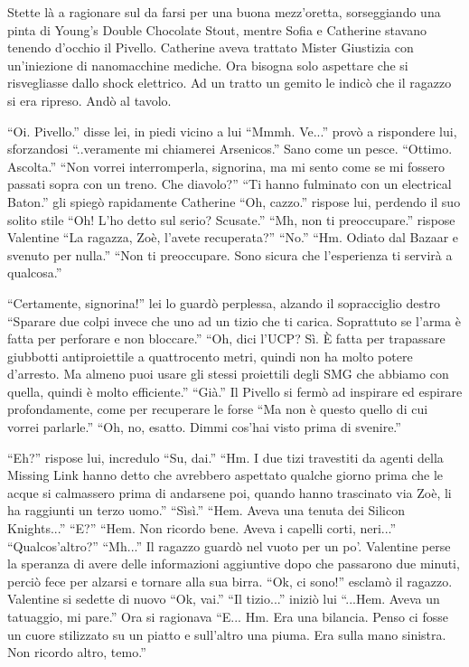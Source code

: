     Stette là a ragionare sul da farsi per una buona mezz'oretta, sorseggiando una pinta di Young's Double Chocolate
    Stout, mentre Sofia e Catherine stavano tenendo d'occhio il Pivello. Catherine aveva trattato Mister Giustizia con
    un'iniezione di nanomacchine mediche. Ora bisogna solo aspettare che si risvegliasse dallo shock elettrico. Ad un
    tratto un gemito le indicò che il ragazzo si era ripreso. Andò al tavolo.

    ``Oi. Pivello.'' disse lei, in piedi vicino a lui ``Mmmh. Ve...'' provò a rispondere lui, sforzandosi ``..veramente
    mi chiamerei Arsenicos.'' Sano come un pesce. ``Ottimo. Ascolta.'' ``Non vorrei interromperla, signorina, ma mi
    sento come se mi fossero passati sopra con un treno. Che diavolo?'' ``Ti hanno fulminato con un electrical Baton.''
    gli spiegò rapidamente Catherine ``Oh, cazzo.'' rispose lui, perdendo il suo solito stile ``Oh! L'ho detto sul
    serio? Scusate.'' ``Mh, non ti preoccupare.'' rispose Valentine ``La ragazza, Zoè, l'avete recuperata?'' ``No.''
    ``Hm. Odiato dal Bazaar e svenuto per nulla.'' ``Non ti preoccupare. Sono sicura che l'esperienza ti servirà a
    qualcosa.'' 

    ``Certamente, signorina!'' lei lo guardò perplessa, alzando il sopracciglio destro ``Sparare due colpi invece che
    uno ad un tizio che ti carica. Soprattuto se l'arma è fatta per perforare e non bloccare.'' ``Oh, dici l'UCP? Sì. È
    fatta per trapassare giubbotti antiproiettile a quattrocento metri, quindi non ha molto potere d'arresto. Ma almeno
    puoi usare gli stessi proiettili degli SMG che abbiamo con quella, quindi è molto efficiente.'' ``Già.'' Il Pivello
    si fermò ad inspirare ed espirare profondamente, come per recuperare le forse ``Ma non è questo quello di cui vorrei
    parlarle.'' ``Oh, no, esatto. Dimmi cos'hai visto prima di svenire.''

    ``Eh?'' rispose lui, incredulo ``Su, dai.'' ``Hm. I due tizi travestiti da agenti della Missing Link hanno detto che
    avrebbero aspettato qualche giorno prima che le acque si calmassero prima di andarsene poi, quando hanno trascinato
    via Zoè, li ha raggiunti un terzo uomo.'' ``Sìsì.'' ``Hem. Aveva una tenuta dei Silicon Knights...'' ``E?'' ``Hem.
    Non ricordo bene. Aveva i capelli corti, neri...'' ``Qualcos'altro?'' ``Mh...'' Il ragazzo guardò nel vuoto per un
    po'. Valentine perse la speranza di avere delle informazioni aggiuntive dopo che passarono due minuti, perciò fece
    per alzarsi e tornare alla sua birra. ``Ok, ci sono!'' esclamò il ragazzo. Valentine si sedette di nuovo ``Ok,
    vai.'' ``Il tizio...'' iniziò lui ``...Hem. Aveva un tatuaggio, mi pare.'' Ora si ragionava ``E... Hm. Era una
    bilancia. Penso ci fosse un cuore stilizzato su un piatto e sull'altro una piuma. Era sulla mano sinistra. Non
    ricordo altro, temo.''

